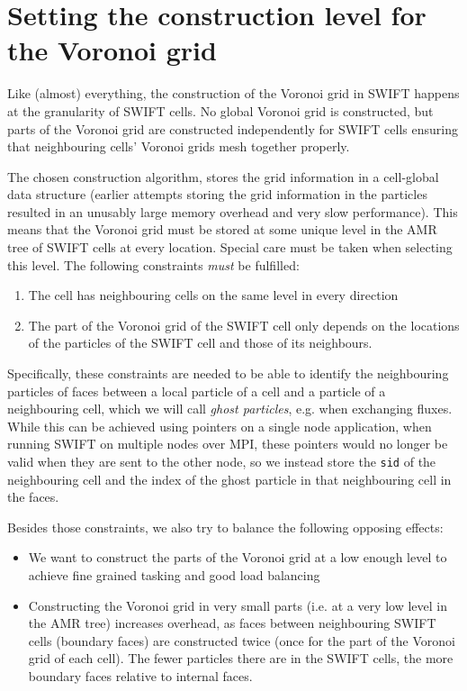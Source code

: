 

\section{Setting the construction level for the Voronoi grid}

Like (almost) everything, the construction of the Voronoi grid in SWIFT happens at the granularity of SWIFT cells. 
No global Voronoi grid is constructed, but parts of the Voronoi grid are constructed independently for SWIFT cells ensuring that neighbouring cells' Voronoi grids mesh together properly.

The chosen construction algorithm, stores the grid information in a cell-global data structure (earlier attempts storing the grid information in the particles resulted in an unusably large memory overhead and very slow performance). 
This means that the Voronoi grid must be stored at some unique level in the AMR tree of SWIFT cells at every location.
Special care must be taken when selecting this level. The following constraints \emph{must} be fulfilled:
\begin{enumerate}
    \item The cell has neighbouring cells on the same level in every direction
    \item The part of the Voronoi grid of the SWIFT cell only depends on the locations of the particles of the SWIFT cell and those of its neighbours.
\end{enumerate}

Specifically, these constraints are needed to be able to identify the neighbouring particles of faces between a local particle of a cell and a particle of a neighbouring cell, which we will call \emph{ghost particles}, e.g. when exchanging fluxes. While this can be achieved using pointers on a single node application, when running SWIFT on multiple nodes over MPI, these pointers would no longer be valid when they are sent to the other node, so we instead store the \texttt{sid} of the neighbouring cell and the index of the ghost particle in that neighbouring cell in the faces.

Besides those constraints, we also try to balance the following opposing effects:
\begin{itemize}
    \item We want to construct the parts of the Voronoi grid at a low enough level to achieve fine grained tasking and good load balancing
    \item Constructing the Voronoi grid in very small parts (i.e. at a very low level in the AMR tree) increases overhead, as faces between neighbouring SWIFT cells (boundary faces) are constructed twice (once for the part of the Voronoi grid of each cell). The fewer particles there are in the SWIFT cells, the more boundary faces relative to internal faces. 
\end{itemize}

